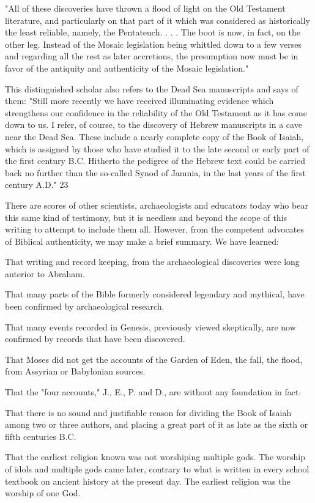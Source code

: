 "All of these discoveries have thrown a flood of light on the Old Testament literature, and
particularly on that part of it which was considered as historically the least reliable, namely,
the Pentateuch. . . . The boot is now, in fact, on the other leg. Instead of the Mosaic
legislation being whittled down to a few verses and regarding all the rest as later accretions,
the presumption now must be in favor of the antiquity and authenticity of the Mosaic
legislation."

This distinguished scholar also refers to the Dead Sea manuscripts and says of them: "Still
more recently we have received illuminating evidence which strengthens our confidence in
the reliability of the Old Testament as it has come down to us. I refer, of course, to the
discovery of Hebrew manuscripts in a cave near the Dead Sea. These include a nearly
complete copy of the Book of Isaiah, which is assigned by those who have studied it to the
late second or early part of the first century B.C. Hitherto the pedigree of the Hebrew text
could be carried back no further than the so-called Synod of Jamnia, in the last years of the
first century A.D." 23

There are scores of other scientists, archaeologists and educators today who bear this same
kind of testimony, but it is needless and beyond the scope of this writing to attempt to include
them all. However, from the competent advocates of Biblical authenticity, we may make a
brief summary. We have learned:

That writing and record keeping, from the archaeological discoveries were long anterior to
Abraham.

That many parts of the Bible formerly considered legendary and mythical, have been
confirmed by archaeological research.

That many events recorded in Genesis, previously viewed skeptically, are now confirmed by
records that have been discovered.

That Moses did not get the accounts of the Garden of Eden, the fall, the flood, from Assyrian
or Babylonian sources.

That the "four accounts," J., E., P. and D., are without any foundation in fact.

That there is no sound and justifiable reason for dividing the Book of Isaiah among two or
three authors, and placing a great part of it as late as the sixth or fifth centuries B.C.

That the earliest religion known was not worshiping multiple gods. The worship of idols and
multiple gods came later, contrary to what is written in every school textbook on ancient
history at the present day. The earliest religion was the worship of one God.

